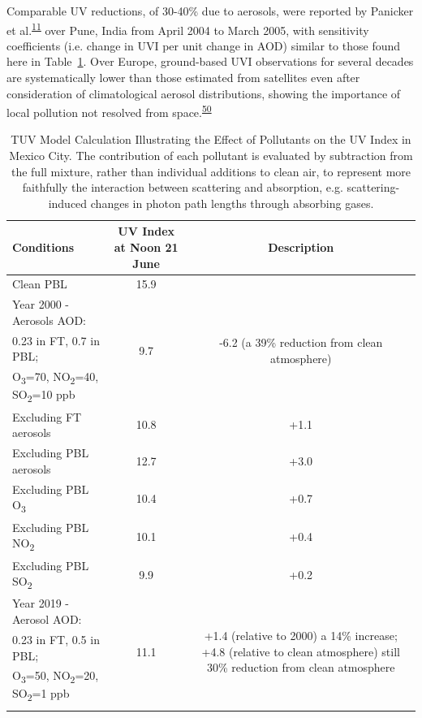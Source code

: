 \documentclass[10pt]{article}
\begin{document}
{Comparable UV reductions, of 30-40\% due to aerosols, were reported by
Panicker et al.}\textsuperscript{\hyperref[csl:11]{11}}{ over Pune, India from April 2004 to
March 2005, with sensitivity coefficients (i.e. change in UVI per unit
change in AOD) similar to those found here in
Table~}{\ref{table:TUVmodel}}{. Over Europe,
ground-based UVI observations for several decades are systematically
lower than those estimated from satellites even after consideration of
climatological aerosol distributions, showing the importance of local
pollution not resolved from space.}\textsuperscript{\hyperref[csl:50]{50}}
\begin{table}[H]
  \centering
  \begin{tabular}{lcc} \hline
  \textbf{Conditions} & \textbf{UV Index at Noon 21 June} & \textbf{Description} \\ \hline
  Clean PBL & 15.9 & \\ \hline
  Year 2000 - Aerosols AOD:&\multirow{3}{*}{9.7}& \multirow{3}{5cm}{-6.2 (a 39\% reduction from clean atmosphere)} \\ 0.23 in FT, 0.7 in PBL;\\ O\textsubscript{3}=70, NO\textsubscript{2}=40, SO\textsubscript{2}=10 ppb\\ \hline
  Excluding FT aerosols & 10.8 & +1.1 \\\hline
  Excluding PBL aerosols & 12.7 & +3.0 \\\hline
  Excluding PBL O\textsubscript{3} & 10.4 & +0.7 \\\hline
  Excluding PBL NO\textsubscript{2} & 10.1 & +0.4 \\\hline
  Excluding PBL SO\textsubscript{2} & 9.9 & +0.2\\\hline
  Year 2019 - Aerosol AOD: & \multirow{4}{*}{11.1} & \multirow{4}{5cm}{+1.4 (relative to 2000) a 14\% increase; +4.8 (relative to clean atmosphere) still 30\% reduction from clean atmosphere}\\
  0.23 in FT, 0.5 in PBL;\\ O\textsubscript{3}=50, NO\textsubscript{2}=20, SO\textsubscript{2}=1 ppb\\ &&\\\hline
  \end{tabular}
  \caption{{TUV Model Calculation Illustrating the Effect of Pollutants on the UV Index in Mexico City. The contribution of each pollutant is evaluated by subtraction from the full mixture, rather than individual additions to clean air, to represent more faithfully the interaction between scattering and absorption, e.g. scattering-induced changes in photon path lengths through absorbing gases.}}
  \label{table:TUVmodel}
  \end{table}
\end{document}

